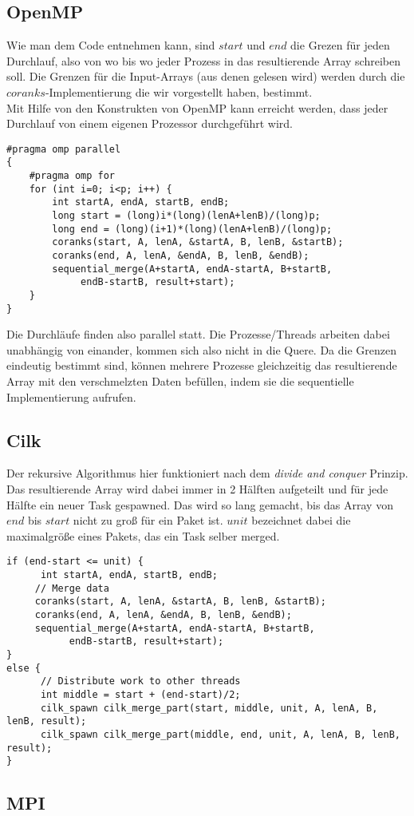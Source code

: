 \subsection{OpenMP}
Wie man dem Code entnehmen kann, sind $start$ und $end$ die Grezen für jeden Durchlauf, also von wo bis wo jeder Prozess in das resultierende Array schreiben soll. Die Grenzen für die Input-Arrays (aus denen gelesen wird) werden durch die $coranks$-Implementierung die wir vorgestellt haben, bestimmt.\\
Mit Hilfe von den Konstrukten von OpenMP kann erreicht werden, dass jeder Durchlauf von einem eigenen Prozessor durchgeführt wird. 
\begin{verbatim}
#pragma omp parallel
{
    #pragma omp for
    for (int i=0; i<p; i++) {
        int startA, endA, startB, endB;
        long start = (long)i*(long)(lenA+lenB)/(long)p;
        long end = (long)(i+1)*(long)(lenA+lenB)/(long)p;
        coranks(start, A, lenA, &startA, B, lenB, &startB);
        coranks(end, A, lenA, &endA, B, lenB, &endB);
        sequential_merge(A+startA, endA-startA, B+startB, 
             endB-startB, result+start);
    }
}
\end{verbatim}
Die Durchläufe finden also parallel statt. Die Prozesse/Threads arbeiten dabei unabhängig von einander, kommen sich also nicht in die Quere. Da die Grenzen eindeutig bestimmt sind, können mehrere Prozesse gleichzeitig das resultierende Array mit den verschmelzten Daten befüllen, indem sie die sequentielle Implementierung aufrufen.

\subsection{Cilk}
Der rekursive Algorithmus hier funktioniert nach dem \emph{divide and conquer} Prinzip. Das resultierende Array wird dabei immer in 2 Hälften aufgeteilt und für jede Hälfte ein neuer Task gespawned. Das wird so lang gemacht, bis das Array von $end$ bis $start$ nicht zu groß für ein Paket ist. $unit$ bezeichnet dabei die maximalgröße eines Pakets, das ein Task selber merged.
\begin{verbatim}
if (end-start <= unit) {
      int startA, endA, startB, endB;
     // Merge data
     coranks(start, A, lenA, &startA, B, lenB, &startB);
     coranks(end, A, lenA, &endA, B, lenB, &endB);
     sequential_merge(A+startA, endA-startA, B+startB, 
           endB-startB, result+start);
}
else {
      // Distribute work to other threads
      int middle = start + (end-start)/2;
      cilk_spawn cilk_merge_part(start, middle, unit, A, lenA, B, lenB, result);
      cilk_spawn cilk_merge_part(middle, end, unit, A, lenA, B, lenB, result);
}
\end{verbatim}

\subsection{MPI}